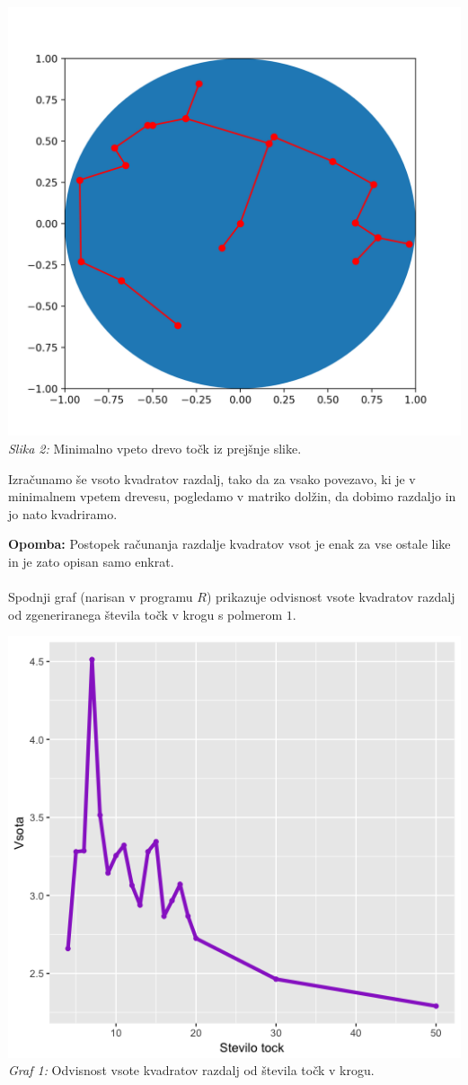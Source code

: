 \documentclass[a4paper]{article}
\begin{document}
\begin{enumerate}
\begin{center}
\includegraphics[scale = 0.3]{slikadrevokrog}\\ 
\scriptsize{\textit{Slika 2: } Minimalno vpeto drevo točk iz prejšnje slike.}
\end{center}
Izračunamo še vsoto kvadratov razdalj, tako da za vsako povezavo, ki je v minimalnem vpetem drevesu, pogledamo v matriko dolžin, da dobimo razdaljo in jo nato kvadriramo.
\end{enumerate} 
\textbf{Opomba: } Postopek računanja razdalje kvadratov vsot je enak za vse ostale like in je zato opisan samo enkrat. \\ \\
Spodnji graf (narisan v programu $R$) prikazuje odvisnost vsote kvadratov razdalj od zgeneriranega števila točk v krogu s polmerom $1$.
\begin{center}
\includegraphics[scale = 0.3]{krog_st_tock}\\ 
\scriptsize{\textit{Graf 1: } Odvisnost vsote kvadratov razdalj od števila točk v krogu.}
\end{center}
\end{document}
